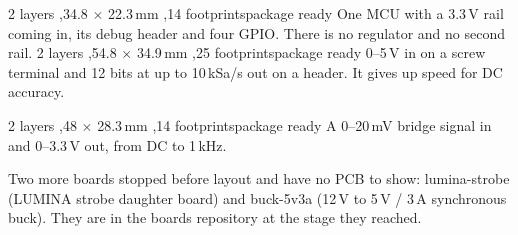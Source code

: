 \boardpair
{%
{2 layers \sep 34.8 $\times$ 22.3\,mm \sep 14 footprints}{package ready}%
{One MCU with a 3.3\,V rail coming in, its debug header and four GPIO. There is
no regulator and no second rail.}}
{%
{2 layers \sep 54.8 $\times$ 34.9\,mm \sep 25 footprints}{package ready}%
{0--5\,V in on a screw terminal and 12 bits at up to 10\,kSa/s out on a header.
It gives up speed for DC accuracy.}}

\newpage

\boardpair
{%
{2 layers \sep 48 $\times$ 28.3\,mm \sep 14 footprints}{package ready}%
{A 0--20\,mV bridge signal in and 0--3.3\,V out, from DC to 1\,kHz.}}
{}


Two more boards stopped before layout and have no PCB to show: lumina-strobe
(LUMINA strobe daughter board) and buck-5v3a (12\,V to 5\,V / 3\,A synchronous
buck). They are in the boards repository at the stage they reached.

\newpage
